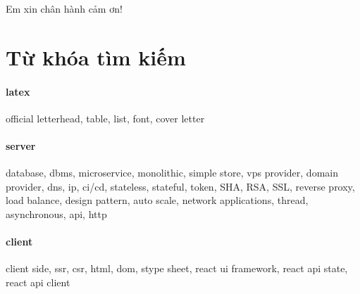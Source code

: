 \documentclass[11pt]{report}
\begin{document}
Em xin chân hành cảm ơn!

\pagebreak






\tableofcontents	
{}

\listoftables
{}


\printglossary[title=Danh sách từ viết tắt, toctitle=Danh sách viết tắt]

\section*{Từ khóa tìm kiếm}
\paragraph{latex} official letterhead, table, list, font, cover letter
\paragraph{server} database, dbms, microservice, monolithic, simple store, vps provider, domain provider, dns, ip, ci/cd, stateless, stateful, token, SHA, RSA, SSL, reverse proxy, load balance, design pattern, auto scale, network applications, thread, asynchronous, api, http
\paragraph{client} client side, ssr, csr, html, dom, stype sheet, react ui framework, react api state, react api client


\clearpage
\justifying
\end{document}
